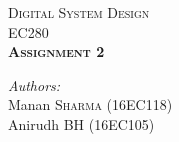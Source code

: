 \documentclass[../main.tex]{subfiles}
\begin{document}
	
	
	\begin{titlepage} %
		\newcommand{\HRule}{\rule{\linewidth}{0.5mm}} %
		
		\center %
	
		
		\vfill \vfill
		\textsc{\LARGE Digital System Design}\\[0.5cm] %
		
		\textsc{\large EC280}\\[0.9cm] %
		
		
		
		
		\textsc{\huge\bfseries Assignment 2}\\[1.9cm] %
		

		
		
		\begin{minipage}{0.4\textwidth}
			\begin{flushleft}
				\large
				\textit{Authors:}\\
				Manan \textsc{Sharma} (16EC118)\\%
				Anirudh \textsc{BH} (16EC105)
			\end{flushleft}
		\end{minipage}
		~
		\begin{minipage}{0.4\textwidth}
			\begin{flushright}
			\end{flushright}
		\end{minipage}
		

\end{titlepage}
\end{document}

